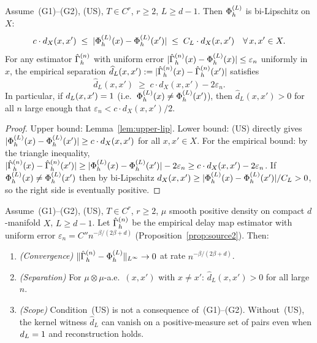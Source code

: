 \begin{theorem}
\label{thm:sep-stable}
Assume~(G1)--(G2), (US), $T \in C^r$, $r \geq 2$, $L \geq d-1$.
Then $\Phi_h^{(L)}$ is bi-Lipschitz on $X$:
\[
  c \cdot d_X(x,x') \;\leq\; |\Phi_h^{(L)}(x) - \Phi_h^{(L)}(x')| \;\leq\; C_L \cdot d_X(x,x')
  \quad\forall\, x, x' \in X.
\]
For any estimator $\hat{\Gamma}_h^{(n)}$ with uniform error
$|\hat{\Gamma}_h^{(n)}(x) - \Phi_h^{(L)}(x)| \leq \varepsilon_n$ uniformly in $x$, the
empirical separation $\widehat{d}_L(x,x') := |\hat{\Gamma}_h^{(n)}(x) - \hat{\Gamma}_h^{(n)}(x')|$
satisfies
\[
  \widehat{d}_L(x,x') \;\geq\; c \cdot d_X(x,x') - 2\varepsilon_n.
\]
In particular, if $d_{L}(x,x') = 1$ (i.e.\ $\Phi_h^{(L)}(x) \neq \Phi_h^{(L)}(x')$),
then $\widehat{d}_L(x,x') > 0$ for all $n$ large enough that
$\varepsilon_n < c \cdot d_X(x,x') / 2$.
\end{theorem}

\begin{proof}
Upper bound: Lemma~\ref{lem:upper-lip}.
Lower bound: (US) directly gives $|\Phi_h^{(L)}(x) - \Phi_h^{(L)}(x')| \geq c \cdot d_X(x,x')$
for all $x, x' \in X$.
For the empirical bound: by the triangle inequality,
$|\hat{\Gamma}_h^{(n)}(x) - \hat{\Gamma}_h^{(n)}(x')| \geq |\Phi_h^{(L)}(x) - \Phi_h^{(L)}(x')| - 2\varepsilon_n
\geq c \cdot d_X(x,x') - 2\varepsilon_n$.
If $\Phi_h^{(L)}(x) \neq \Phi_h^{(L)}(x')$ then by bi-Lipschitz $d_X(x,x') \geq |\Phi_h^{(L)}(x)-\Phi_h^{(L)}(x')|/C_L > 0$,
so the right side is eventually positive.
\end{proof}

\begin{theorem}
\label{thm:dynamics}
Assume~(G1)--(G2), (US), $T \in C^r$, $r \geq 2$, $\mu$ smooth positive
density on compact $d$-manifold $X$, $L \geq d-1$.
Let $\hat{\Gamma}_h^{(n)}$ be the empirical delay map estimator with uniform error
$\varepsilon_n = C'' n^{-\beta/(2\beta+d)}$ (Proposition~\ref{prop:source2}).
Then:
\begin{enumerate}[label=(\alph*)]
  \item \emph{(Convergence)} $\|\hat{\Gamma}_h^{(n)} - \Phi_h^{(L)}\|_{L^{\infty}} \to 0$ at
    rate $n^{-\beta/(2\beta+d)}$.
  \item \emph{(Separation)} For $\mu \otimes \mu$-a.e.\ $(x,x')$ with
    $x \neq x'$: $\widehat{d}_L(x,x') > 0$ for all large $n$.
  \item \emph{(Scope)} Condition~(US) is not a consequence of~(G1)--(G2).
    Without~(US), the kernel witness $\widehat{d}_L$ can vanish on a positive-measure
    set of pairs even when $d_{L} = 1$ and reconstruction holds.
\end{enumerate}
\end{theorem}

